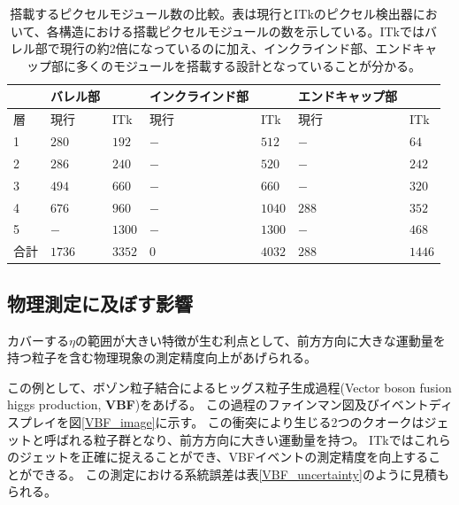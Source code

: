 \begin{table}[tbp]
\begin{center}
\caption[搭載するピクセルモジュール数の比較]{搭載するピクセルモジュール数の比較。表は現行とITkのピクセル検出器において、各構造における搭載ピクセルモジュールの数を示している。ITkではバレル部で現行の約2倍になっているのに加え、インクラインド部、エンドキャップ部に多くのモジュールを搭載する設計となっていることが分かる。}
\label{compare_itk_modules}
  \begin{tabular}{|l||ll|ll|ll|} \hline
          & バレル部 &            & インクラインド部 & & エンドキャップ部 & \\ \hline 
    層    & 現行     & ITk        & 現行& ITk          & 現行  & ITk \\ \hline
    1     & $280$    & $192$      & $-$ & $512$        & $-$   & $64$ \\ 
    2     & $286$    & $240$      & $-$ & $520$        & $-$   & $242$ \\ 
    3     & $494$    & $660$      & $-$ & $660$        & $-$   & $320$ \\ 
    4     & $676$    & $960$      & $-$ & $1040$       & $288$ & $352$ \\ 
    5     & $-$      & $1300$     & $-$ & $1300$       & $-$   & $468$ \\ \hline
    合計  & $1736$   & $3352$     & $0$ & $4032$       & $288$ & $1446$ \\ \hline\hline
  \end{tabular}
\end{center}
\end{table}

\subsection{物理測定に及ぼす影響}
カバーする$\eta$の範囲が大きい特徴が生む利点として、前方方向に大きな運動量を持つ粒子を含む物理現象の測定精度向上があげられる。

この例として、ボゾン粒子結合によるヒッグス粒子生成過程(Vector boson fusion higgs production, \textbf{VBF})をあげる。
この過程のファインマン図及びイベントディスプレイを図\ref{VBF_image}に示す。
この衝突により生じる2つのクオークはジェットと呼ばれる粒子群となり、前方方向に大きい運動量を持つ。
ITkではこれらのジェットを正確に捉えることができ、VBFイベントの測定精度を向上することができる。
この測定における系統誤差は表\ref{VBF_uncertainty}のように見積もられる\cite{1-3}。

